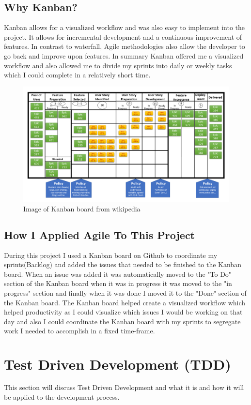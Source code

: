 \subsection{Why Kanban?}
Kanban \cite{Kanban} allows for a visualized workflow and was also easy to implement into the project. It allows for incremental development and a continuous improvement of features.  In contrast to waterfall, Agile methodologies also allow the developer to go back and improve upon features.  In summary Kanban offered me a visualized workflow and also allowed me to divide my sprints into daily or weekly tasks which I could complete in a relatively short time.
\begin{figure}
\includegraphics[width=3\linewidth]{img/kanban.png}
\caption{Image of Kanban board from wikipedia}
\label{fig:Image of Kanban board}
\end{figure}
\subsection{How I Applied Agile To This Project}
During this project I used a Kanban board on Github \cite{KanbanBoard} to coordinate
my sprints(Backlog) and added the issues that needed to be finished to the Kanban board.   When an issue was added it was automatically moved to the "To Do" section of the Kanban board when it was in progress it was moved to the "in progress" section and finally when it was done I moved it to the "Done" section of the Kanban board.  The Kanban board helped create a visualized workflow which helped productivity as I could visualize which issues I would be working on that day and also I could coordinate
the Kanban board with my sprints to segregate work I needed to accomplish in a fixed
time-frame.
\section{Test Driven Development (TDD)}
This section will discuss Test Driven Development and what it is and how it will be applied to the development process.
